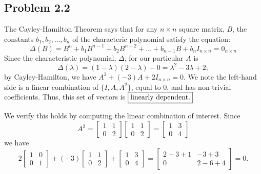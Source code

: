 \documentclass{homework}
\begin{document}
\subsection{Problem 2.2}
The Cayley-Hamilton Theorem says that for any $n \times n$ square matrix, $B$,
the constants $b_1, b_2, \dots, b_n$ of the characteric polynomial satisfy
the equation:
\begin{equation}
    \Delta(B) = B^n + b_1 B^{n-1} + b_2 B^{n-2} + \dots + b_{n-1} B + b_n I_{n\times n} = 0_{n\times n}
\end{equation}
Since the characteristic polynomial, $\Delta$, for our particular $A$ is
\begin{equation}
    \Delta(\lambda) = (1 - \lambda) (2 - \lambda) - 0 = \lambda^2 - 3 \lambda + 2;
\end{equation}
by Cayley-Hamilton, we have $A^2 + (-3) A + 2 I_{n \times n}=0$. We note
the left-hand side is a linear combination of $\{I, A, A^2\}$, equal to
0, and has non-trivial coefficients. Thus, this set of vectors is
$\boxed{$linearly dependent.$}$ 

We verify this holds by computing the linear combination of interest. Since
\begin{equation}
    A^2 = \begin{bmatrix}
        1 & 1 \\ 0 & 2
    \end{bmatrix} \begin{bmatrix}
        1 & 1 \\ 0 & 2
    \end{bmatrix} = \begin{bmatrix}
        1 & 3 \\ 0 & 4
    \end{bmatrix}
\end{equation}
we have
\begin{equation}
    2 \begin{bmatrix}
        1 & 0 \\ 0 & 1
    \end{bmatrix} + (-3) \begin{bmatrix}
        1 & 1 \\ 0 & 2
    \end{bmatrix} + \begin{bmatrix}
        1 & 3 \\ 0 & 4
    \end{bmatrix} = \begin{bmatrix}
        2 - 3 + 1 & -3 + 3 \\
        0 & 2 - 6 + 4
    \end{bmatrix} = 0.
\end{equation}
\end{document}
